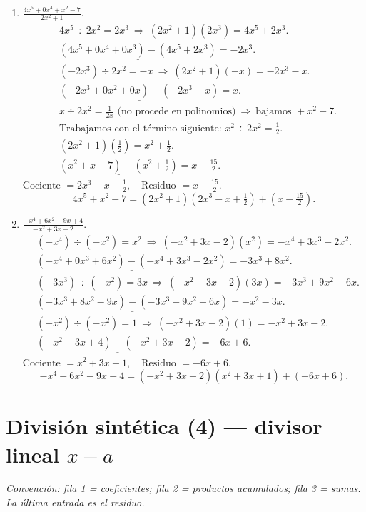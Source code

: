 \documentclass[14pt]{extarticle}
\begin{document}
\begin{enumerate}[label=(\arabic*)]
		\item \(\displaystyle \frac{4x^{5}+0x^{4}+x^{2}-7}{\,2x^{2}+1\,}\).
		\[
		\begin{aligned}
			&4x^{5}\div 2x^{2}=2x^{3}\ \Rightarrow\ (2x^{2}+1)(2x^{3})=4x^{5}+2x^{3}.\\
			&\underline{(4x^{5}+0x^{4}+0x^{3})-(4x^{5}+2x^{3})}=-2x^{3}.\\[2pt]
			&(-2x^{3})\div 2x^{2}=-x\ \Rightarrow\ (2x^{2}+1)(-x)=-2x^{3}-x.\\
			&\underline{(-2x^{3}+0x^{2}+0x)-(-2x^{3}-x)}=x.\\[2pt]
			&x\div 2x^{2}=\tfrac{1}{2x}\text{ (no procede en polinomios)}\ \Rightarrow\ \text{bajamos }+x^{2}-7.\\
			&\text{Trabajamos con el término siguiente: }x^{2}\div 2x^{2}=\tfrac12.\\
			&(2x^{2}+1)\!\left(\tfrac12\right)=x^{2}+\tfrac12.\\
			&\underline{(x^{2}+x-7)-(x^{2}+\tfrac12)}=x-\tfrac{15}{2}.
		\end{aligned}
		\]
		\(\boxed{\text{Cociente }=2x^{3}-x+\tfrac12,\quad \text{Residuo }=x-\tfrac{15}{2}}\).
		\[
		4x^{5}+x^{2}-7=(2x^{2}+1)\!\left(2x^{3}-x+\tfrac12\right)+\left(x-\tfrac{15}{2}\right).
		\]
		
		\item \(\displaystyle \frac{-x^{4}+6x^{2}-9x+4}{-x^{2}+3x-2}\).
		\[
		\begin{aligned}
			&(-x^{4})\div(-x^{2})=x^{2}\ \Rightarrow\ (-x^{2}+3x-2)(x^{2})=-x^{4}+3x^{3}-2x^{2}.\\
			&\underline{(-x^{4}+0x^{3}+6x^{2})-(-x^{4}+3x^{3}-2x^{2})}=-3x^{3}+8x^{2}.\\[2pt]
			&(-3x^{3})\div(-x^{2})=3x\ \Rightarrow\ (-x^{2}+3x-2)(3x)=-3x^{3}+9x^{2}-6x.\\
			&\underline{(-3x^{3}+8x^{2}-9x)-(-3x^{3}+9x^{2}-6x)}=-x^{2}-3x.\\[2pt]
			&(-x^{2})\div(-x^{2})=1\ \Rightarrow\ (-x^{2}+3x-2)(1)=-x^{2}+3x-2.\\
			&\underline{(-x^{2}-3x+4)-(-x^{2}+3x-2)}=-6x+6.
		\end{aligned}
		\]
		\(\boxed{\text{Cociente }=x^{2}+3x+1,\quad \text{Residuo }=-6x+6}\).
		\[
		-x^{4}+6x^{2}-9x+4=(-x^{2}+3x-2)(x^{2}+3x+1)+(-6x+6).
		\]
	\end{enumerate}
	
	\section*{División sintética (4) — divisor lineal \(x-a\)}
	\textit{Convención: fila 1 = coeficientes; fila 2 = productos acumulados; fila 3 = sumas. La última entrada es el residuo.}
	
\end{document}
